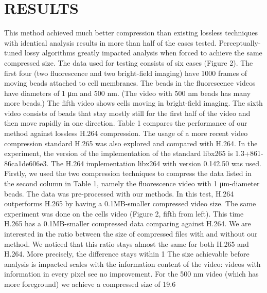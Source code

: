 \section{RESULTS}
This method achieved much better compression than existing lossless techniques with identical analysis results in more than half of the cases tested.  Perceptually-tuned lossy algorithms greatly impacted analysis when forced to achieve the same compressed size.
The data used for testing consists of six cases (Figure 2).  The first four (two fluorescence and two bright-field imaging) have 1000 frames of moving beads attached to cell membranes.  The beads in the fluorescence videos have diameters of 1 μm and 500 nm.  (The video with 500 nm beads has many more beads.)  The fifth video shows cells moving in bright-field imaging.  The sixth video consists of beads that stay mostly still for the first half of the video and then move rapidly in one direction.
Table 1 compares the performance of our method against lossless H.264 compression. The usage of a more recent video compression standard H.265 was also explored and compared with H.264. In the experiment, the version of the implementation of the standard libx265 is 1.3+861-86ca1de606e3. The H.264 implementation libx264 with version 0.142.50 was used. Firstly, we used the two compression techniques to compress the data listed in the second column in Table 1, namely the fluorescence video with 1 μm-diameter beads. The data was pre-processed with our methods. In this test, H.264 outperforms H.265 by having a 0.1MB-smaller compressed video size. The same experiment was done on the cells video (Figure 2, fifth from left). This time H.265 has a 0.1MB-smaller compressed data comparing against H.264. We are interested in the ratio between the size of compressed files with and without our method. We noticed that this ratio stays almost the same for both H.265 and H.264. More precisely, the difference stays within 1%
The size achievable before analysis is impacted scales with the information content of the video: videos with information in every pixel see no improvement.  For the 500 nm video (which has more foreground) we achieve a compressed size of 19.6%
